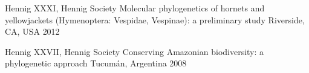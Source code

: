\begin{cventries}
  \cventry
    {Hennig XXXI, Hennig Society} %
    {Molecular phylogenetics of hornets and yellowjackets (Hymenoptera: 
    Vespidae, Vespinae): a preliminary study} %
    {Riverside, CA, USA} %
    {2012} %
    {}

  \cventry
    {Hennig XXVII, Hennig Society} %
    {Conserving Amazonian biodiversity: a phylogenetic approach} %
    {Tucumán, Argentina} %
    {2008} %
    {}

\end{cventries}
